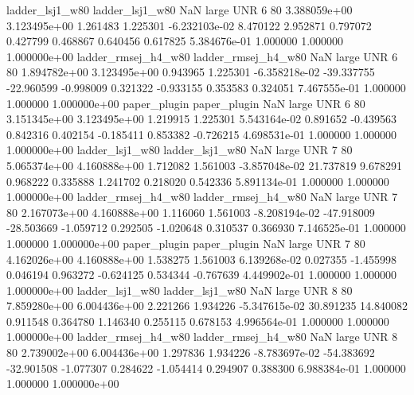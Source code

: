     ladder_lsj1_w80     ladder_lsj1_w80                   NaN      large      UNR                 6 80 3.388059e+00   3.123495e+00      1.261483       1.225301 -6.232103e-02      8.470122      2.952871     0.797072       0.427799  0.468867   0.640456     0.617825   5.384676e-01            1.000000        1.000000        1.000000e+00
ladder_rmsej_h4_w80 ladder_rmsej_h4_w80                   NaN      large      UNR                 6 80 1.894782e+00   3.123495e+00      0.943965       1.225301 -6.358218e-02    -39.337755    -22.960599    -0.998009       0.321322 -0.933155   0.353583     0.324051   7.467555e-01            1.000000        1.000000        1.000000e+00
       paper_plugin        paper_plugin                   NaN      large      UNR                 6 80 3.151345e+00   3.123495e+00      1.219915       1.225301  5.543164e-02      0.891652     -0.439563     0.842316       0.402154 -0.185411   0.853382    -0.726215   4.698531e-01            1.000000        1.000000        1.000000e+00
    ladder_lsj1_w80     ladder_lsj1_w80                   NaN      large      UNR                 7 80 5.065374e+00   4.160888e+00      1.712082       1.561003 -3.857048e-02     21.737819      9.678291     0.968222       0.335888  1.241702   0.218020     0.542336   5.891134e-01            1.000000        1.000000        1.000000e+00
ladder_rmsej_h4_w80 ladder_rmsej_h4_w80                   NaN      large      UNR                 7 80 2.167073e+00   4.160888e+00      1.116060       1.561003 -8.208194e-02    -47.918009    -28.503669    -1.059712       0.292505 -1.020648   0.310537     0.366930   7.146525e-01            1.000000        1.000000        1.000000e+00
       paper_plugin        paper_plugin                   NaN      large      UNR                 7 80 4.162026e+00   4.160888e+00      1.538275       1.561003  6.139268e-02      0.027355     -1.455998     0.046194       0.963272 -0.624125   0.534344    -0.767639   4.449902e-01            1.000000        1.000000        1.000000e+00
    ladder_lsj1_w80     ladder_lsj1_w80                   NaN      large      UNR                 8 80 7.859280e+00   6.004436e+00      2.221266       1.934226 -5.347615e-02     30.891235     14.840082     0.911548       0.364780  1.146340   0.255115     0.678153   4.996564e-01            1.000000        1.000000        1.000000e+00
ladder_rmsej_h4_w80 ladder_rmsej_h4_w80                   NaN      large      UNR                 8 80 2.739002e+00   6.004436e+00      1.297836       1.934226 -8.783697e-02    -54.383692    -32.901508    -1.077307       0.284622 -1.054414   0.294907     0.388300   6.988384e-01            1.000000        1.000000        1.000000e+00
